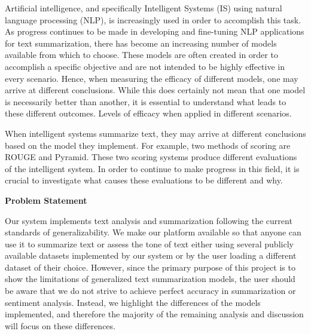 \vspace{5pt}

Artificial intelligence, and specifically Intelligent Systems (IS) using natural language processing (NLP), is increasingly used in order to accomplish this task. As progress continues to be made in developing and fine-tuning NLP applications for text summarization, there has become an increasing number of models available from which to choose.
These models are often created in order to accomplish a specific objective and are not intended to be highly effective in every scenario. Hence, when measuring the efficacy of different models, one may arrive at different conclusions.
While this does certainly not mean that one model is necessarily better than another, it is essential to understand what leads to these different outcomes.
Levels of efficacy when applied in different scenarios. 

\vspace{5pt}

When intelligent systems summarize text, they may arrive at different conclusions based on the model they implement.
For example, two methods of scoring are ROUGE\cite{Rouge} and Pyramid\cite{Pyramid}.
These two scoring systems produce different evaluations of the intelligent system.
In order to continue to make progress in this field, it is crucial to investigate what causes these evaluations to be different and why.


\vspace{5pt}

\begin{large}
    \noindent\textbf{Problem Statement}
\end{large}

Our system implements text analysis and summarization following the current standards of generalizability.
We make our platform available so that anyone can use it to summarize text or assess the tone of text either using several publicly available datasets implemented by our system or by the user loading a different dataset of their choice.
However, since the primary purpose of this project is to show the limitations of generalized text summarization models, the user should be aware that we do not strive to achieve perfect accuracy in summarization or sentiment analysis.
Instead, we highlight the differences of the models implemented, and therefore the majority of the remaining analysis and discussion will focus on these differences. 

\vspace{5pt}

